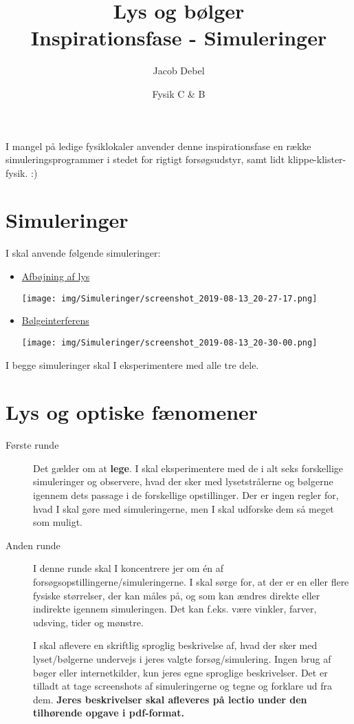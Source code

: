 \documentclass[a4paper, 12pt]{article}
\author{Jacob Debel}
\date{Fysik C \& B}
\title{Lys og bølger\\\medskip
\large Inspirationsfase - Simuleringer}
\begin{document}
\maketitle
I mangel på ledige fysiklokaler anvender denne inspirationsfase  en række simuleringsprogrammer i stedet for rigtigt forsøgsudstyr, samt lidt klippe-klister-fysik. :) 

\section*{Simuleringer}
\label{sec:org61e4617}

I skal anvende følgende simuleringer:

\begin{itemize}
\item \href{https://phet.colorado.edu/sims/html/bending-light/latest/bending-light\_da.html}{Afbøjning af lys}
\begin{center}
\texttt{[image: img/Simuleringer/screenshot\_2019-08-13\_20-27-17.png]}
\end{center}

\item \href{https://phet.colorado.edu/sims/html/wave-interference/latest/wave-interference\_da.html}{Bølgeinterferens}
\begin{center}
\texttt{[image: img/Simuleringer/screenshot\_2019-08-13\_20-30-00.png]}
\end{center}
\end{itemize}

I begge simuleringer skal I eksperimentere med alle tre dele.


\section*{Lys og optiske fænomener}
\label{sec:org9e0c81c}

\begin{description}
\item[{Første runde}] Det gælder om at \textbf{lege}. I skal eksperimentere med de i alt seks forskellige simuleringer og observere, hvad der sker med lysetstrålerne og bølgerne igennem dets passage i de forskellige opstillinger. Der er ingen regler for, hvad I skal gøre med simuleringerne, men I skal udforske dem så meget som muligt.

\item[{Anden runde}] I denne runde skal I koncentrere jer om én af forsøgsopstillingerne/simuleringerne. I skal sørge for, at der er en eller flere fysiske størrelser, der kan måles på, og som kan ændres direkte eller indirekte igennem simuleringen. Det kan f.eks. være vinkler, farver, udsving, tider og mønstre.

I skal aflevere en skriftlig sproglig beskrivelse af, hvad der sker med lyset/bølgerne undervejs i jeres valgte forsøg/simulering. Ingen brug af bøger eller internetkilder, kun jeres egne sproglige beskrivelser. Det er tilladt at tage screenshots af simuleringerne og tegne og forklare ud fra dem. \textbf{Jeres beskrivelser skal afleveres på lectio under den tilhørende opgave i pdf-format.}
\end{description}
\end{document}
